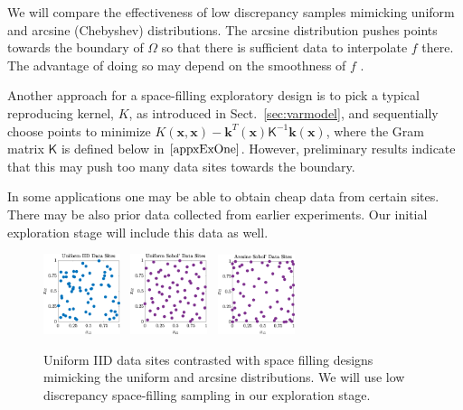 \documentclass[11pt]{NSFamsart}
\newcommand{\mK}{\mathsf{K}}
\newcommand{\bx}{{\boldsymbol{x}}}
\newcommand{\bk}{{\boldsymbol{k}}}
\begin{document}
We will compare the effectiveness of low discrepancy samples mimicking uniform and arcsine (Chebyshev) distributions.
The arcsine distribution pushes points towards the boundary of $\Omega$ so that there is sufficient data to interpolate $f$ there.  The advantage of doing so may depend on the smoothness of $f$ \cite{HicLi12a}.

Another approach for a space-filling exploratory design is to pick a typical reproducing kernel, $K$, as introduced in Sect.\ \ref{sec:varmodel}, and sequentially choose points to minimize $K(\bx,\bx) - \bk^T(\bx) \mK^{-1} \bk(\bx)$, where the Gram matrix $\mK$ is defined below in $\eqref{appxExOne}$.  However, preliminary results indicate that this may push too many data sites towards the boundary.

In some applications one may be able to obtain cheap data from certain sites.  There may be also prior data collected from earlier experiments.  Our initial exploration stage will include this data as well.


\begin{figure} %
\centering
\includegraphics[width = 0.20\textwidth]{ProgramsImages/IIDPoints.eps} \ 
\includegraphics[width = 0.20\textwidth]{ProgramsImages/SSobolPoints.eps} \ 
\includegraphics[width = 0.20\textwidth]{ProgramsImages/ChebSSobolPoints.eps} 
\caption{Uniform IID data sites contrasted with space filling designs mimicking the uniform  and arcsine distributions.
We will use low discrepancy space-filling sampling in our exploration stage.
\label{PtsFig}}
\end{figure}
\end{document}
